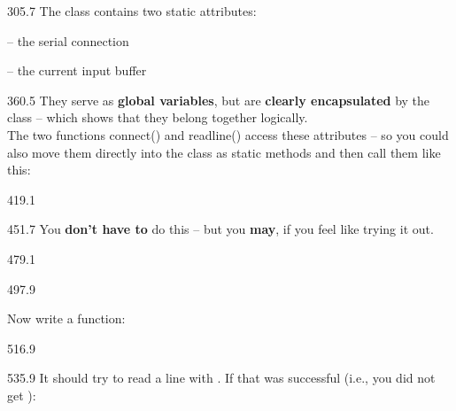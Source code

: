 \documentclass{aslab}
\begin{document}
\begin{region}[pitch=13.6]{305.7}
The class  contains two static attributes:
\begin{dashlist}
\item {} -- the serial connection
\item {} -- the current input buffer
\end{dashlist}
\end{region}

\begin{region}[pitch=13.23]{360.5}
They serve as \textbf{global variables}, but are \textbf{clearly
encapsulated} by the class -- which shows that they belong together
logically.\\
The two functions connect() and readline() access these attributes -- so
you could also move them directly into the class as static methods and then
call them like this:
\end{region}

\begin{region}[pitch=13.2]{419.1}
\\
\end{region}

\begin{region}{451.7}
You \textbf{don't have to} do this -- but you \textbf{may}, if you feel like
trying it out.
\end{region}

\begin{region}{479.1}
\end{region}

\begin{region}{497.9}
\begin{tasks}
\item Now write a function:
\end{tasks}
\end{region}

\begin{region}[x=74.7,right=0]{516.9}
\end{region}

\begin{region}[x=74.7,right=0,pitch=13.5]{535.9}
It should try to read a line with . If that was successful
(i.e., you did not get ):
\end{region}
\end{document}
